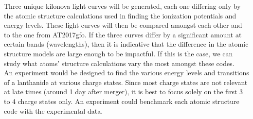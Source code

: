 \documentclass[11pt,a4paper]{article}
\begin{document}
Three unique kilonova light curves will be generated, each one differing only by the atomic structure calculations used in finding the ionization potentials and energy levels. These light curves will then be compared amongst each other and to the one from AT2017gfo. If the three curves differ by a significant amount at certain bands (wavelengths), then it is indicative that the difference in the atomic structure models are large enough to be impactful. If this is the case, we can study what atoms' structure calculations vary the most amongst these codes.\\  

An experiment would be designed to find the various energy levels and transitions of a lanthanide at various charge states. Since most charge states are not relevant at late times (around 1 day after merger), it is best to focus solely on the first 3 to 4 charge states only. An experiment could benchmark each atomic structure code with the experimental data.




\end{document}
